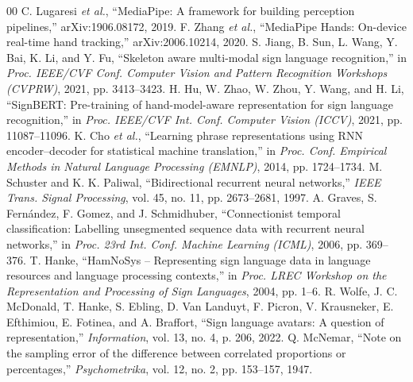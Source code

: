 \documentclass[conference]{IEEEtran}
\begin{document}
\begin{thebibliography}{00}
 C. Lugaresi \textit{et al.}, ``MediaPipe: A framework for building perception pipelines,'' arXiv:1906.08172, 2019.
 F. Zhang \textit{et al.}, ``MediaPipe Hands: On-device real-time hand tracking,'' arXiv:2006.10214, 2020.
 S. Jiang, B. Sun, L. Wang, Y. Bai, K. Li, and Y. Fu, ``Skeleton aware multi-modal sign language recognition,'' in \textit{Proc. IEEE/CVF Conf. Computer Vision and Pattern Recognition Workshops (CVPRW)}, 2021, pp. 3413--3423.
 H. Hu, W. Zhao, W. Zhou, Y. Wang, and H. Li, ``SignBERT: Pre-training of hand-model-aware representation for sign language recognition,'' in \textit{Proc. IEEE/CVF Int. Conf. Computer Vision (ICCV)}, 2021, pp. 11087--11096.
 K. Cho \textit{et al.}, ``Learning phrase representations using RNN encoder--decoder for statistical machine translation,'' in \textit{Proc. Conf. Empirical Methods in Natural Language Processing (EMNLP)}, 2014, pp. 1724--1734.
 M. Schuster and K. K. Paliwal, ``Bidirectional recurrent neural networks,'' \textit{IEEE Trans. Signal Processing}, vol. 45, no. 11, pp. 2673--2681, 1997.
 A. Graves, S. Fern\'andez, F. Gomez, and J. Schmidhuber, ``Connectionist temporal classification: Labelling unsegmented sequence data with recurrent neural networks,'' in \textit{Proc. 23rd Int. Conf. Machine Learning (ICML)}, 2006, pp. 369--376.
 T. Hanke, ``HamNoSys -- Representing sign language data in language resources and language processing contexts,'' in \textit{Proc. LREC Workshop on the Representation and Processing of Sign Languages}, 2004, pp. 1--6.
 R. Wolfe, J. C. McDonald, T. Hanke, S. Ebling, D. Van Landuyt, F. Picron, V. Krausneker, E. Efthimiou, E. Fotinea, and A. Braffort, ``Sign language avatars: A question of representation,'' \textit{Information}, vol. 13, no. 4, p. 206, 2022.
 Q. McNemar, ``Note on the sampling error of the difference between correlated proportions or percentages,'' \textit{Psychometrika}, vol. 12, no. 2, pp. 153--157, 1947.
\end{thebibliography}
\end{document}
